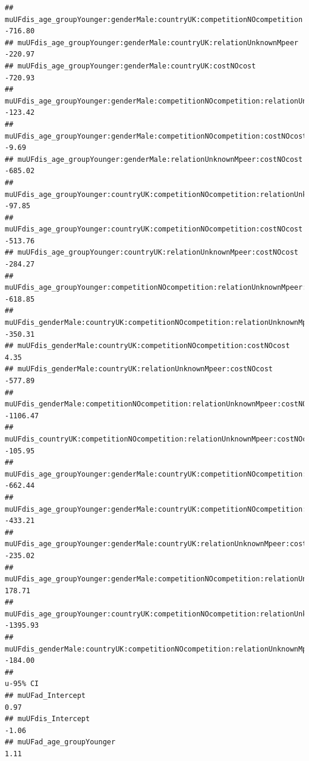 \documentclass[
]{article}
\begin{document}
\begin{verbatim}
## muUFdis_age_groupYounger:genderMale:countryUK:competitionNOcompetition                        -716.80
## muUFdis_age_groupYounger:genderMale:countryUK:relationUnknownMpeer                            -220.97
## muUFdis_age_groupYounger:genderMale:countryUK:costNOcost                                      -720.93
## muUFdis_age_groupYounger:genderMale:competitionNOcompetition:relationUnknownMpeer             -123.42
## muUFdis_age_groupYounger:genderMale:competitionNOcompetition:costNOcost                         -9.69
## muUFdis_age_groupYounger:genderMale:relationUnknownMpeer:costNOcost                           -685.02
## muUFdis_age_groupYounger:countryUK:competitionNOcompetition:relationUnknownMpeer               -97.85
## muUFdis_age_groupYounger:countryUK:competitionNOcompetition:costNOcost                        -513.76
## muUFdis_age_groupYounger:countryUK:relationUnknownMpeer:costNOcost                            -284.27
## muUFdis_age_groupYounger:competitionNOcompetition:relationUnknownMpeer:costNOcost             -618.85
## muUFdis_genderMale:countryUK:competitionNOcompetition:relationUnknownMpeer                    -350.31
## muUFdis_genderMale:countryUK:competitionNOcompetition:costNOcost                                 4.35
## muUFdis_genderMale:countryUK:relationUnknownMpeer:costNOcost                                  -577.89
## muUFdis_genderMale:competitionNOcompetition:relationUnknownMpeer:costNOcost                  -1106.47
## muUFdis_countryUK:competitionNOcompetition:relationUnknownMpeer:costNOcost                    -105.95
## muUFdis_age_groupYounger:genderMale:countryUK:competitionNOcompetition:relationUnknownMpeer   -662.44
## muUFdis_age_groupYounger:genderMale:countryUK:competitionNOcompetition:costNOcost             -433.21
## muUFdis_age_groupYounger:genderMale:countryUK:relationUnknownMpeer:costNOcost                 -235.02
## muUFdis_age_groupYounger:genderMale:competitionNOcompetition:relationUnknownMpeer:costNOcost   178.71
## muUFdis_age_groupYounger:countryUK:competitionNOcompetition:relationUnknownMpeer:costNOcost  -1395.93
## muUFdis_genderMale:countryUK:competitionNOcompetition:relationUnknownMpeer:costNOcost         -184.00
##                                                                                              u-95% CI
## muUFad_Intercept                                                                                 0.97
## muUFdis_Intercept                                                                               -1.06
## muUFad_age_groupYounger                                                                          1.11

\end{verbatim}
\end{document}
